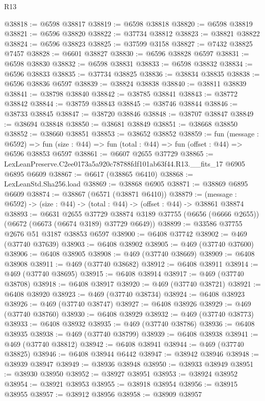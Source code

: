\begin{lexlean}{R13}
\begin{coremodule}
@38818 := @6598 @38817
@38819 := @6598 @38818
@38820 := @6598 @38819
@38821 := @6596 @38820
@38822 := @37734 @38812
@38823 := @38821 @38822
@38824 := @6596 @38823
@38825 := @37599 @3158
@38827 := @7432 @38825 @7457
@38828 := @6601 @38827
@38830 := @6596 @38828 @6597
@38831 := @6598 @38830
@38832 := @6598 @38831
@38833 := @6598 @38832
@38834 := @6596 @38833
@38835 := @37734 @38825
@38836 := @38834 @38835
@38838 := @6596 @38836 @6597
@38839 := @38824 @38838
@38840 := @38811 @38839
@38841 := @38798 @38840
@38842 := @38785 @38841
@38843 := @38772 @38842
@38844 := @38759 @38843
@38845 := @38746 @38844
@38846 := @38733 @38845
@38847 := @38720 @38846
@38848 := @38707 @38847
@38849 := @38694 @38848
@38850 := @38681 @38849
@38851 := @38668 @38850
@38852 := @38660 @38851
@38853 := @38652 @38852
@38859 := fun (message : @6592) =>
  fun (size : @44) => fun (total : @44) => fun (offset : @44) => @6596 @38853 @6597
@38861 := @6607 @2655 @37729
@38865 := LexLeanPreserve.C2ee0173a5a920c78788fdf101ab63f44.R13.__fits_17 @6905 @6895 @6609
@38867 := @6617 (@38865 @6410)
@38868 := LexLeanStd.Sha256.load
@38869 := @38868 @6905
@38871 := @38869 @6895 @6609
@38874 := @38867 (@6571 (@38871 @6410))
@38879 := (message : @6592) -> (size : @44) -> (total : @44) -> (offset : @44) -> @38861 @38874
@38893 := @6631
    @2655
    @37729
    @38874
    @3189
    @37755
    (@6656 (@6666 @2655))
    (@6672 (@6673 (@6674 @3189) @37729 @6649))
@38899 := @33586 @37755 @2676 @51 @3187 @38853 @6597
@38900 := @6408 @37742
@38902 := @469 (@37740 @37639)
@38903 := @6408 @38902
@38905 := @469 (@37740 @37600)
@38906 := @6408 @38905
@38908 := @469 (@37740 @38669)
@38909 := @6408 @38908
@38911 := @469 (@37740 @38682)
@38912 := @6408 @38911
@38914 := @469 (@37740 @38695)
@38915 := @6408 @38914
@38917 := @469 (@37740 @38708)
@38918 := @6408 @38917
@38920 := @469 (@37740 @38721)
@38921 := @6408 @38920
@38923 := @469 (@37740 @38734)
@38924 := @6408 @38923
@38926 := @469 (@37740 @38747)
@38927 := @6408 @38926
@38929 := @469 (@37740 @38760)
@38930 := @6408 @38929
@38932 := @469 (@37740 @38773)
@38933 := @6408 @38932
@38935 := @469 (@37740 @38786)
@38936 := @6408 @38935
@38938 := @469 (@37740 @38799)
@38939 := @6408 @38938
@38941 := @469 (@37740 @38812)
@38942 := @6408 @38941
@38944 := @469 (@37740 @38825)
@38946 := @6408 @38944 @6442
@38947 := @38942 @38946
@38948 := @38939 @38947
@38949 := @38936 @38948
@38950 := @38933 @38949
@38951 := @38930 @38950
@38952 := @38927 @38951
@38953 := @38924 @38952
@38954 := @38921 @38953
@38955 := @38918 @38954
@38956 := @38915 @38955
@38957 := @38912 @38956
@38958 := @38909 @38957

\end{coremodule}
\end{lexlean}
